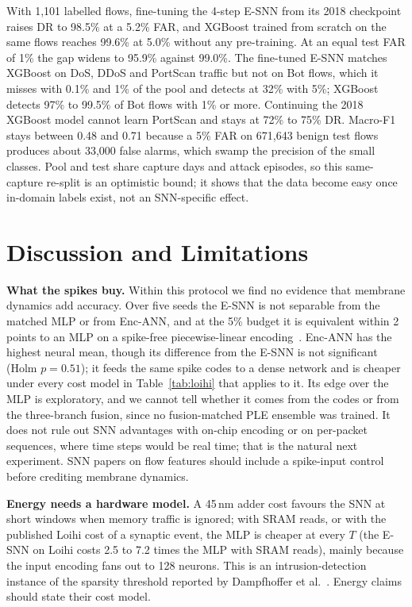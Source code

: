 \documentclass[conference]{IEEEtran}
\begin{document}
With 1{,}101 labelled flows, fine-tuning the 4-step E-SNN from its 2018 checkpoint raises DR to 98.5\% at a 5.2\% FAR, and XGBoost trained from scratch on the same flows reaches 99.6\% at 5.0\% without any pre-training. At an equal test FAR of 1\% the gap widens to 95.9\% against 99.0\%. The fine-tuned E-SNN matches XGBoost on DoS, DDoS and PortScan traffic but not on Bot flows, which it misses with 0.1\% and 1\% of the pool and detects at 32\% with 5\%; XGBoost detects 97\% to 99.5\% of Bot flows with 1\% or more. Continuing the 2018 XGBoost model cannot learn PortScan and stays at 72\% to 75\% DR. Macro-F1 stays between 0.48 and 0.71 because a 5\% FAR on 671{,}643 benign test flows produces about 33{,}000 false alarms, which swamp the precision of the small classes. Pool and test share capture days and attack episodes, so this same-capture re-split is an optimistic bound; it shows that the data become easy once in-domain labels exist, not an SNN-specific effect.

\section{Discussion and Limitations}

\textbf{What the spikes buy.} Within this protocol we find no evidence that membrane dynamics add accuracy. Over five seeds the E-SNN is not separable from the matched MLP or from Enc-ANN, and at the 5\% budget it is equivalent within 2 points to an MLP on a spike-free piecewise-linear encoding~\cite{gorishniy2022}. Enc-ANN has the highest neural mean, though its difference from the E-SNN is not significant (Holm $p = 0.51$); it feeds the same spike codes to a dense network and is cheaper under every cost model in Table~\ref{tab:loihi} that applies to it. Its edge over the MLP is exploratory, and we cannot tell whether it comes from the codes or from the three-branch fusion, since no fusion-matched PLE ensemble was trained. It does not rule out SNN advantages with on-chip encoding or on per-packet sequences, where time steps would be real time; that is the natural next experiment. SNN papers on flow features should include a spike-input control before crediting membrane dynamics.

\textbf{Energy needs a hardware model.} A 45\,nm adder cost favours the SNN at short windows when memory traffic is ignored; with SRAM reads, or with the published Loihi cost of a synaptic event, the MLP is cheaper at every $T$ (the E-SNN on Loihi costs 2.5 to 7.2 times the MLP with SRAM reads), mainly because the input encoding fans out to 128 neurons. This is an intrusion-detection instance of the sparsity threshold reported by Dampfhoffer et al.~\cite{dampfhoffer2023}. Energy claims should state their cost model.
\end{document}
